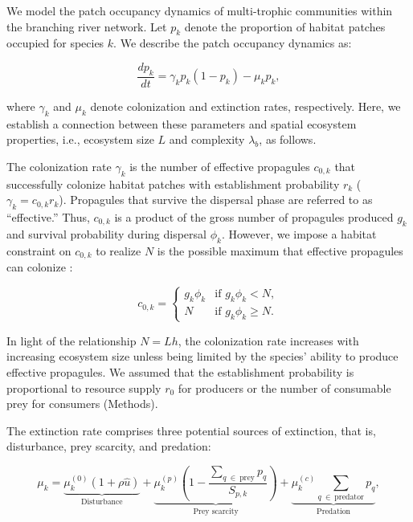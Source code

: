 \documentclass[11pt, class=article, crop=false]{standalone}
\begin{document}
We model the patch occupancy dynamics of multi-trophic communities within the branching river network.
Let $p_k$ denote the proportion of habitat patches occupied for species $k$.
We describe the patch occupancy dynamics as:

\begin{equation}
    \frac{dp_k}{dt} = \gamma_{k} p_k (1 - p_k) - \mu_k p_k,
    \label{eq:model0}
\end{equation}

where $\gamma_k$ and $\mu_k$ denote colonization and extinction rates, respectively.
Here, we establish a connection between these parameters and spatial ecosystem properties, i.e., ecosystem size $L$ and complexity $\lambda_b$, as follows.

The colonization rate $\gamma_k$ is the number of effective propagules $c_{0,k}$ that successfully colonize habitat patches with establishment probability $r_k$ ($\gamma_k = c_{0,k} r_k$).
Propagules that survive the dispersal phase are referred to as ``effective.'' Thus, $c_{0,k}$ is a product of the gross number of propagules produced $g_k$ and survival probability during dispersal $\phi_k$.
However, we impose a habitat constraint on $c_{0,k}$ to realize $N$ is the possible maximum that effective propagules can colonize \citep{takimoto_effects_2012, terui_spatial_2019}:

\begin{equation}
    c_{0, k} = 
    \begin{cases}
        g_k \phi_k & \text{if $g_k \phi_k < N$},\\
        N & \text{if $g_k \phi_k \ge N$}.
    \end{cases}
    \label{eq:c0-prod}
\end{equation}

In light of the relationship $N = Lh$, the colonization rate increases with increasing ecosystem size unless being limited by the species' ability to produce effective propagules.
We assumed that the establishment probability is proportional to resource supply $r_0$ for producers or the number of consumable prey for consumers (Methods).

The extinction rate comprises three potential sources of extinction, that is, disturbance, prey scarcity, and predation:

\begin{equation}
    \mu_{k} = 
        \underbrace{\mu_{k}^{(0)} (1 + \rho \hat{u})}_{\text{Disturbance}} + 
        \underbrace{\mu_{k}^{(p)} \left(1 - \frac{\sum_{q~\in~\text{prey}} p_{q}}{S_{p, k}} \right)}_{\text{Prey scarcity}} + 
        \underbrace{\mu_{k}^{(c)} \sum_{q~\in~\text{predator}} p_{q}}_{\text{Predation}},
    \label{eq:extn}    
\end{equation}
\end{document}
